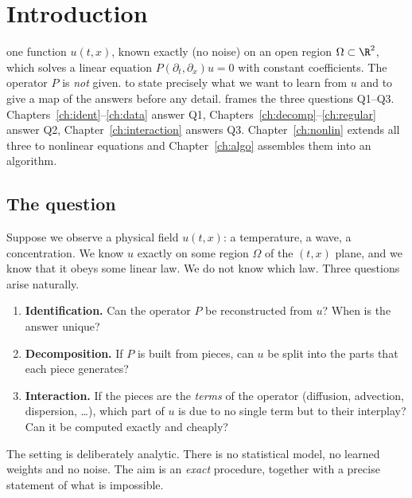 \chapter{Introduction}\label{ch:intro}
\chapterbrief
{one function $u(t,x)$, known exactly (no noise) on an open region $\Omega\subset\R^2$, which solves a linear equation $P(\partial_t,\partial_x)u=0$ with constant coefficients. The operator $P$ is \emph{not} given.}
{to state precisely what we want to learn from $u$ and to give a map of the answers before any detail.}
{frames the three questions Q1--Q3. Chapters~\ref{ch:ident}--\ref{ch:data} answer Q1, Chapters~\ref{ch:decomp}--\ref{ch:regular} answer Q2, Chapter~\ref{ch:interaction} answers Q3. Chapter~\ref{ch:nonlin} extends all three to nonlinear equations and Chapter~\ref{ch:algo} assembles them into an algorithm.}

\section{The question}

Suppose we observe a physical field $u(t,x)$: a temperature, a wave, a concentration. We know $u$ exactly on some region $\Omega$ of the $(t,x)$ plane, and we know that it obeys some linear law. We do not know which law. Three questions arise naturally.

\begin{enumerate}[label=\textbf{Q\arabic*.},leftmargin=1.2cm]
\item \textbf{Identification.} Can the operator $P$ be reconstructed from $u$? When is the answer unique?
\item \textbf{Decomposition.} If $P$ is built from pieces, can $u$ be split into the parts that each piece generates?
\item \textbf{Interaction.} If the pieces are the \emph{terms} of the operator (diffusion, advection, dispersion, \dots), which part of $u$ is due to no single term but to their interplay? Can it be computed exactly and cheaply?
\end{enumerate}

The setting is deliberately analytic. There is no statistical model, no learned weights and no noise. The aim is an \emph{exact} procedure, together with a precise statement of what is impossible.

